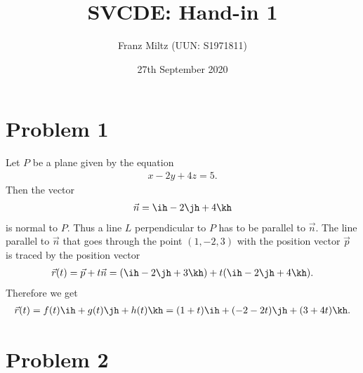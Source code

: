 \documentclass{article}
\begin{document}
\title{SVCDE: Hand-in 1}
\author{Franz Miltz (UUN: S1971811)}
\date{27th September 2020}
\maketitle


\section*{Problem 1}


Let $P$ be a plane given by the equation
\begin{align*}
  x - 2y + 4z = 5.
\end{align*}
Then the vector
\begin{align*}
  \vec n = \ih - 2 \jh + 4 \kh
\end{align*}
is normal to $P$. Thus a line $L$ perpendicular to $P$ has to be
parallel to $\vec n$. The line parallel to $\vec n$ that goes through
the point $(1,-2,3)$ with the position vector $\vec p$ is traced by the position vector
\begin{align*}
  \vec r(t) = \vec p + t \vec n
  = (\ih - 2\jh + 3\kh) + t(\ih - 2\jh + 4\kh).
\end{align*}
Therefore we get
\begin{align*}
  \vec r (t) = f(t)\ih + g(t)\jh + h(t)\kh = (1+t)\ih+(-2-2t)\jh+(3+4t)\kh.
\end{align*}


\section*{Problem 2}
\end{document}
